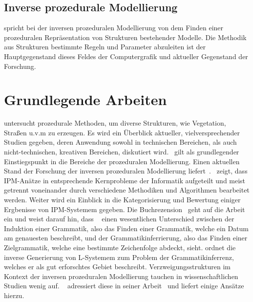 \subsection*{Inverse prozedurale Modellierung}
\citeauthor{aliaga_2016} spricht bei der inversen prozeduralen Modellierung von dem Finden einer prozeduralen Repräsentation
von Strukturen bestehender Modelle.
Die Methodik aus Strukturen bestimmte Regeln und Parameter abzuleiten ist der Hauptgegenstand dieses Feldes der
Computergrafik und aktueller Gegenstand der Forschung.

\section{Grundlegende Arbeiten}

\citeauthor{smelik_2014} untersucht prozedurale Methoden, um diverse Strukturen, wie Vegetation, Straßen u.v.m zu erzeugen.
Es wird ein Überblick aktueller, vielversprechender Studien gegeben, deren Anwendung sowohl in technischen Bereichen,
als auch nicht-technischen, kreativen Bereichen, diskutiert wird.~\cite{smelik_2014} gilt als grundlegender Einstiegspunkt
in die Bereiche der prozeduralen Modellierung.
Einen aktuellen Stand der Forschung der inversen prozeduralen Modellierung liefert~\cite{aliaga_2016}.~
zeigt, dass IPM-Anätze in entsprechende Kernprobleme der Informatik aufgeteilt und meist getrennt voneinander durch
verschiedene Methodiken und Algorithmen bearbeitet werden.
Weiter wird ein Einblick in die Kategorisierung und Bewertung einiger Ergbenisse von IPM-Systemem gegeben.
Die Buchrezension~\cite{daelemans_2010} geht auf die Arbeit~\cite{higuera_2010} ein und weist darauf hin, dass
~\citeauthor{higuera_2010} einen wesentlichen Unterschied zwischen der Induktion einer Grammatik, also das Finden einer
Grammatik, welche ein Datum am genauesten beschreibt, und der Grammatikinferrierung, also das Finden einer Zielgrammatik,
welche eine bestimmte Zeichenfolge abdeckt, sieht.
\citeauthor{higuera_2010} ordnet die inverse Generierung von L-Systemem zum Problem der Grammatikinferrenz, welches er
als gut erforschtes Gebiet beschreibt.
Verzweigungsstrukturen im Kontext der inversen prozeduralen Modellierung tauchen in wissenschaftlichen Studien wenig auf.
~\cite{guo_2020} adressiert diese in seiner Arbeit~\cite{guo_2020} und liefert einige Ansätze hierzu.\\~\\


